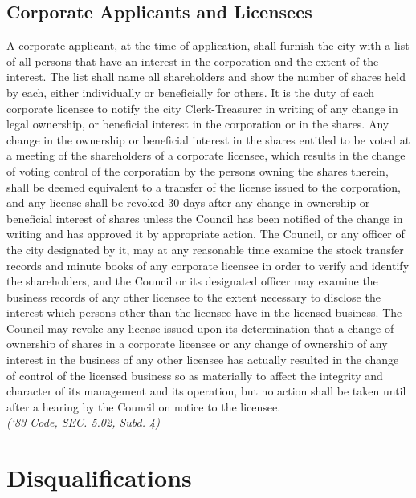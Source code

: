 \subsection{Corporate Applicants and Licensees}
A corporate applicant, at the time of application, shall furnish the city with a list of all persons that have an interest in the corporation and the extent of the interest.  The list shall name all shareholders and show the number of shares held by each, either individually or beneficially for others.  It is the duty of each corporate licensee to notify the city Clerk-Treasurer in writing of any change in legal ownership, or beneficial interest in the corporation or in the shares.  Any change in the ownership or beneficial interest in the shares entitled to be voted at a meeting of the shareholders of a corporate licensee, which results in the change of voting control of the corporation by the persons owning the shares therein, shall be deemed equivalent to a transfer of the license issued to the corporation, and any license shall be revoked 30 days after any change in ownership or beneficial interest of shares unless the Council has been notified of the change in writing and has approved it by appropriate action.  The Council, or any officer of the city designated by it, may at any reasonable time examine the stock transfer records and minute books of any corporate licensee in order to verify and identify the shareholders, and the Council or its designated officer may examine the business records of any other licensee to the extent necessary to disclose the interest which persons other than the licensee have in the licensed business.  The Council may revoke any license issued upon its determination that a change of ownership of shares in a corporate licensee or any change of ownership of any interest in the business of any other licensee has actually resulted in the change of control of the licensed business so as materially to affect the integrity and character of its management and its operation, but no action shall be taken until after a hearing by the Council on notice to the licensee.\\
\emph{(‘83 Code, SEC. 5.02, Subd. 4)}
\section{Disqualifications}
